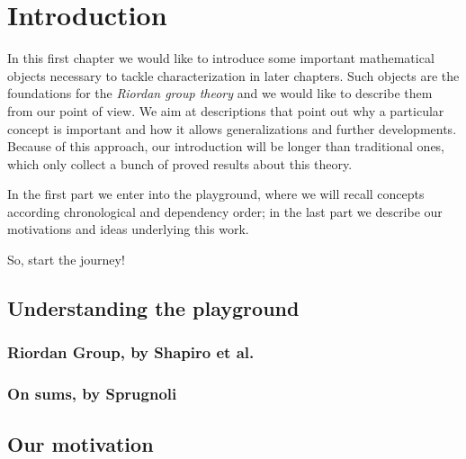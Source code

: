 
\chapter{Introduction}

In this first chapter we would like to introduce some
important mathematical objects necessary to tackle 
characterization in later chapters. Such objects are the 
foundations for the \emph{Riordan group theory} and 
we would like to describe them from our point of view.
We aim at descriptions that point out why a particular 
concept is important and how it allows generalizations
and further developments. Because of this approach,
our introduction will be longer than traditional ones,
which only collect a bunch of proved results about this theory.

In the first part we enter into the playground, where
we will recall concepts according chronological and
dependency order; in the last part we describe our motivations
and ideas underlying this work. 

So, start the journey!

\section{Understanding the playground}





\subsection{Riordan Group, by Shapiro et al.}
\subsection{On sums, by Sprugnoli}


\section{Our motivation}

